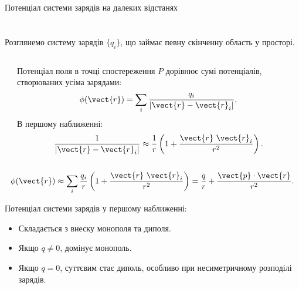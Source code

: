 \documentclass{beamer}
\begin{document}
\begin{frame}{Потенціал системи зарядів на далеких відстанях}{}
\section{}
Розглянемо систему зарядів $\{q_i\}$, що займає певну скінченну область у просторі.

\begin{columns}
	\begin{column}{0.4\linewidth}
         
	\end{column}
	\begin{column}{0.6\linewidth}
 \begin{block}{}
    Потенціал поля в точці спостереження $P$ дорівнює сумі потенціалів, створюваних усіма зарядами:
    \begin{equation*}
    	\phi(\vect{r}) = \sum_i \frac{q_i}{|\vect{r} - \vect{r}_i|},
    \end{equation*}
    В першому наближенні:
    \begin{equation*}
        \frac{1}{|\vect{r} - \vect{r}_i|} \approx \frac1r \left(1 + \frac{\vect{r}\ \vect{r}_i}{r^2}\right).
    \end{equation*}
\end{block}
	\end{column}
\end{columns}


\begin{equation*}
	\phi(\vect{r}) \approx \sum_i \frac{q_i}r \left(1 + \frac{\vect{r}\ \vect{r}_i}{r^2}\right) = \frac{q}r + \frac{ \vect{p}\cdot\vect{r}}{r^2}.
\end{equation*}


Потенціал системи зарядів у першому наближенні:
\begin{itemize}
\item Складається з внеску монополя та диполя.
\item Якщо $q \neq 0$, домінує монополь.
\item Якщо $q = 0$, суттєвим стає диполь, особливо при несиметричному розподілі зарядів.
\end{itemize}
\end{frame}
\end{document}
